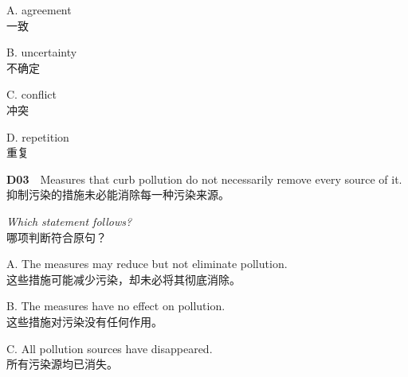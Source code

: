 \documentclass[a4paper,11pt,openany]{report}
\newcommand{\zhline}[1]{{\CJKsf\color{bodygrey}#1}}
\begin{document}
\begin{samepage}
A. agreement\\
\zhline{一致}
\par\end{samepage}

\begin{samepage}
B. uncertainty\\
\zhline{不确定}
\par\end{samepage}

\begin{samepage}
C. conflict\\
\zhline{冲突}
\par\end{samepage}

\begin{samepage}
D. repetition\\
\zhline{重复}
\par\end{samepage}

\begin{samepage}
\textbf{D03}　Measures that curb pollution do not necessarily remove every source of it.\\
\zhline{抑制污染的措施未必能消除每一种污染来源。}
\par\end{samepage}

\begin{samepage}
\emph{Which statement follows?}\\
\zhline{哪项判断符合原句？}
\par\end{samepage}

\begin{samepage}
A. The measures may reduce but not eliminate pollution.\\
\zhline{这些措施可能减少污染，却未必将其彻底消除。}
\par\end{samepage}

\begin{samepage}
B. The measures have no effect on pollution.\\
\zhline{这些措施对污染没有任何作用。}
\par\end{samepage}

\begin{samepage}
C. All pollution sources have disappeared.\\
\zhline{所有污染源均已消失。}
\par\end{samepage}
\end{document}
